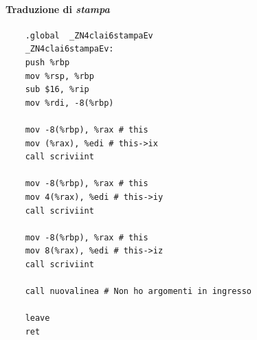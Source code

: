 \paragraph{Traduzione di \emph{stampa}} 
\begin{verbatim}
	.global  _ZN4clai6stampaEv
	_ZN4clai6stampaEv:
	push %rbp
	mov %rsp, %rbp
	sub $16, %rip
	mov %rdi, -8(%rbp)
	
	mov -8(%rbp), %rax # this
	mov (%rax), %edi # this->ix
	call scriviint
	
	mov -8(%rbp), %rax # this
	mov 4(%rax), %edi # this->iy
	call scriviint
	
	mov -8(%rbp), %rax # this
	mov 8(%rax), %edi # this->iz
	call scriviint
	
	call nuovalinea # Non ho argomenti in ingresso
	
	leave
	ret
\end{verbatim}

